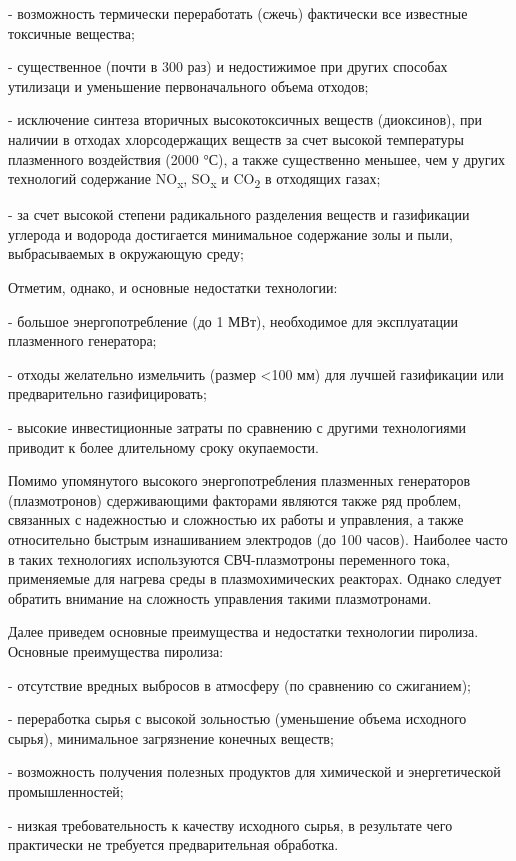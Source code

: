 \begin{multicols}{2}
- возможность термически переработать (сжечь) фактически все известные
токсичные вещества;

- существенное (почти в 300 раз) и недостижимое при других способах
утилизаци и уменьшение первоначального объема отходов;

- исключение синтеза вторичных высокотоксичных веществ (диоксинов), при
наличии в отходах хлорсодержащих веществ за счет высокой температуры
плазменного воздействия (2000 °С), а также существенно меньшее, чем у
других технологий содержание NO\textsubscript{x}, SO\textsubscript{x} и
CO\textsubscript{2} в отходящих газах;

- за счет высокой степени радикального разделения веществ и газификации
углерода и водорода достигается минимальное содержание золы и пыли,
выбрасываемых в окружающую среду;

Отметим, однако, и основные недостатки технологии:

- большое энергопотребление (до 1 МВт), необходимое для эксплуатации
плазменного генератора;

- отходы желательно измельчить (размер <100 мм) для лучшей
газификации или предварительно газифицировать;

- высокие инвестиционные затраты по сравнению с другими технологиями
приводит к более длительному сроку окупаемости.

Помимо упомянутого высокого энергопотребления плазменных генераторов
(плазмотронов) сдерживающими факторами являются также ряд проблем,
связанных с надежностью и сложностью их работы и управления, а также
относительно быстрым изнашиванием электродов (до 100 часов). Наиболее
часто в таких технологиях используются СВЧ-плазмотроны переменного тока,
применяемые для нагрева среды в плазмохимических реакторах. Однако
следует обратить внимание на сложность управления такими плазмотронами.

Далее приведем основные преимущества и недостатки технологии пиролиза.
Основные преимущества пиролиза:

- отсутствие вредных выбросов в атмосферу (по срав­нению со сжиганием);

- переработка сырья с высокой зольностью (уменьше­ние объема исходного
сырья), минимальное загрязнение конечных веществ;

- возможность получения полезных продуктов для химической и
энергетической промышленностей;

- низкая требовательность к качеству исходного сырья, в результате чего
практически не требуется предвари­тельная обработка.


\end{multicols}
